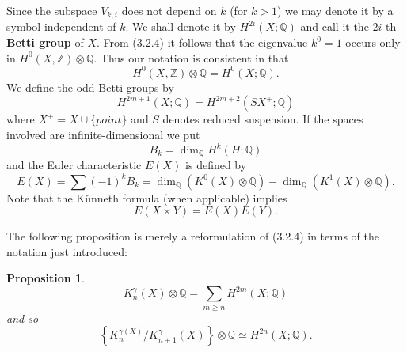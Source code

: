 \documentclass[leqno]{book}
\numberwithin{equation}{section}
\newtheorem{proposition}[theorem]{Proposition}
\theoremstyle{definition}
\renewcommand{\emph}{\textbf}
\begin{document}
            Since the subspace $V_{k,i}$ does not depend on $k$ (for $k>1$) we may denote it by a symbol independent of $k$. We shall denote it by $H^{2i}(X;\mathbb{Q})$ and call it the $2i$-th \emph{Betti group} of $X$. From (3.2.4) it follows that the eigenvalue $k^{0}=1$ occurs only in $H^{0}(X,\mathbb{Z})\otimes \mathbb{Q}$. Thus our notation is consistent in that 
            \begin{equation*}
              H^{0}(X,\mathbb{Z})\otimes \mathbb{Q}=H^{0}(X;\mathbb{Q}).
            \end{equation*}
            We define the odd Betti groups by
            \begin{equation*}
              H^{2m+1}(X;\mathbb{Q})=H^{2m+2}(SX^{+};\mathbb{Q})
            \end{equation*}
            where $X^{+}=X \cup \{point\}$ and $S$ denotes reduced suspension. If the spaces involved are infinite-dimensional we put 
            \begin{equation*}
              B_{k}=\operatorname{dim}_{\mathbb{Q}}H^{k}(H;\mathbb{Q})
            \end{equation*}
            and the Euler characteristic $E(X)$ is defined by 
            \begin{equation*}
              E(X)=\sum(-1)^{k}B_{k}=\operatorname{dim}_{\mathbb{Q}}(K^{0}(X)\otimes \mathbb{Q})-\operatorname{dim}_{\mathbb{Q}}(K^{1}(X)\otimes \mathbb{Q}).
            \end{equation*}
            Note that the Künneth formula (when applicable) implies
            \begin{equation*}
              E(X\times Y)=E(X)E(Y).
            \end{equation*}

            The following proposition is merely a reformulation of (3.2.4) in terms of the notation just introduced:

            \begin{proposition}
              \begin{equation*}
                K^{\gamma}_{n}(X)\otimes \mathbb{Q}=\sum_{m\ge n} H^{2m}(X;\mathbb{Q})
              \end{equation*}
              and so
              \begin{equation*}
                \left\{K^{\gamma(X)}_{n}/K^{\gamma}_{n+1}(X)\right\} \otimes \mathbb{Q}\simeq H^{2n}(X;\mathbb{Q}).
              \end{equation*}
            \end{proposition}
\end{document}
